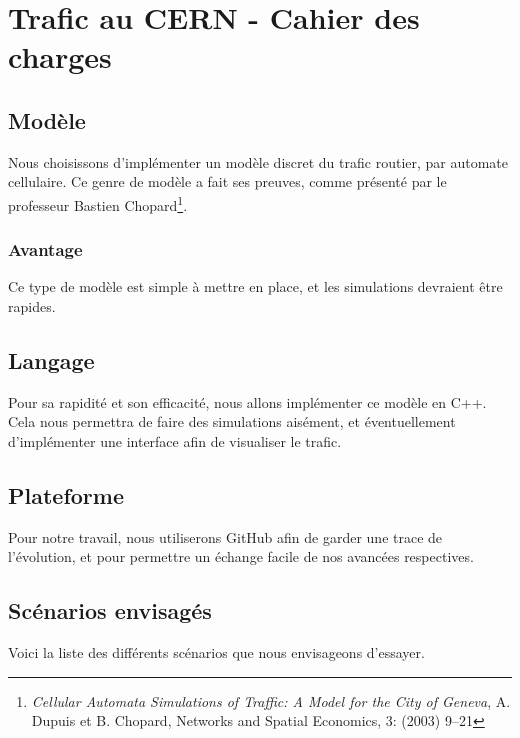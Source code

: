 \documentclass[a4paper,10pt]{extarticle}
\begin{document}
\pagestyle{fancy}
\renewcommand{\headheight}{24pt}
\rhead{\today}

\section*{Trafic au CERN - Cahier des charges}

\subsection*{Modèle}

Nous choisissons d'implémenter un modèle discret du trafic routier, par automate cellulaire. Ce genre de modèle a fait ses preuves, comme présenté par le professeur Bastien Chopard\footnote{\emph{Cellular Automata Simulations of Traffic:
A Model for the City of Geneva}, A. Dupuis et B. Chopard, Networks and Spatial Economics, 3: (2003) 9–21}.

\subsubsection*{Avantage}

Ce type de modèle est simple à mettre en place, et les simulations devraient être rapides.

\subsection*{Langage}

Pour sa rapidité et son efficacité, nous allons implémenter ce modèle en C++. Cela nous permettra de faire des simulations aisément, et éventuellement d'implémenter une interface afin de visualiser le trafic.

\subsection*{Plateforme}

Pour notre travail, nous utiliserons GitHub afin de garder une trace de l'évolution, et pour permettre un échange facile de nos avancées respectives.

\subsection*{Scénarios envisagés}

Voici la liste des différents scénarios que nous envisageons d'essayer.
\end{document}
